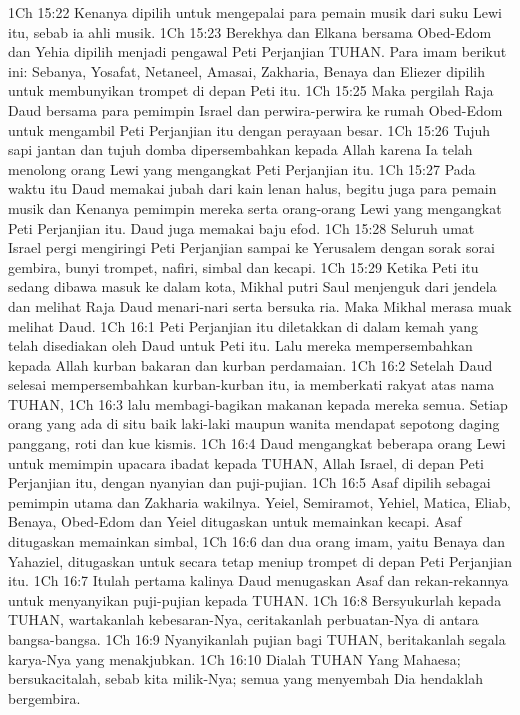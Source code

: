 1Ch 15:22  Kenanya dipilih untuk mengepalai para pemain musik dari suku Lewi itu, sebab ia ahli musik.
1Ch 15:23  Berekhya dan Elkana bersama Obed-Edom dan Yehia dipilih menjadi pengawal Peti Perjanjian TUHAN. Para imam berikut ini: Sebanya, Yosafat, Netaneel, Amasai, Zakharia, Benaya dan Eliezer dipilih untuk membunyikan trompet di depan Peti itu.
1Ch 15:25  Maka pergilah Raja Daud bersama para pemimpin Israel dan perwira-perwira ke rumah Obed-Edom untuk mengambil Peti Perjanjian itu dengan perayaan besar.
1Ch 15:26  Tujuh sapi jantan dan tujuh domba dipersembahkan kepada Allah karena Ia telah menolong orang Lewi yang mengangkat Peti Perjanjian itu.
1Ch 15:27  Pada waktu itu Daud memakai jubah dari kain lenan halus, begitu juga para pemain musik dan Kenanya pemimpin mereka serta orang-orang Lewi yang mengangkat Peti Perjanjian itu. Daud juga memakai baju efod.
1Ch 15:28  Seluruh umat Israel pergi mengiringi Peti Perjanjian sampai ke Yerusalem dengan sorak sorai gembira, bunyi trompet, nafiri, simbal dan kecapi.
1Ch 15:29  Ketika Peti itu sedang dibawa masuk ke dalam kota, Mikhal putri Saul menjenguk dari jendela dan melihat Raja Daud menari-nari serta bersuka ria. Maka Mikhal merasa muak melihat Daud.
1Ch 16:1  Peti Perjanjian itu diletakkan di dalam kemah yang telah disediakan oleh Daud untuk Peti itu. Lalu mereka mempersembahkan kepada Allah kurban bakaran dan kurban perdamaian.
1Ch 16:2  Setelah Daud selesai mempersembahkan kurban-kurban itu, ia memberkati rakyat atas nama TUHAN,
1Ch 16:3  lalu membagi-bagikan makanan kepada mereka semua. Setiap orang yang ada di situ baik laki-laki maupun wanita mendapat sepotong daging panggang, roti dan kue kismis.
1Ch 16:4  Daud mengangkat beberapa orang Lewi untuk memimpin upacara ibadat kepada TUHAN, Allah Israel, di depan Peti Perjanjian itu, dengan nyanyian dan puji-pujian.
1Ch 16:5  Asaf dipilih sebagai pemimpin utama dan Zakharia wakilnya. Yeiel, Semiramot, Yehiel, Matica, Eliab, Benaya, Obed-Edom dan Yeiel ditugaskan untuk memainkan kecapi. Asaf ditugaskan memainkan simbal,
1Ch 16:6  dan dua orang imam, yaitu Benaya dan Yahaziel, ditugaskan untuk secara tetap meniup trompet di depan Peti Perjanjian itu.
1Ch 16:7  Itulah pertama kalinya Daud menugaskan Asaf dan rekan-rekannya untuk menyanyikan puji-pujian kepada TUHAN.
1Ch 16:8  Bersyukurlah kepada TUHAN, wartakanlah kebesaran-Nya, ceritakanlah perbuatan-Nya di antara bangsa-bangsa.
1Ch 16:9  Nyanyikanlah pujian bagi TUHAN, beritakanlah segala karya-Nya yang menakjubkan.
1Ch 16:10  Dialah TUHAN Yang Mahaesa; bersukacitalah, sebab kita milik-Nya; semua yang menyembah Dia hendaklah bergembira.
